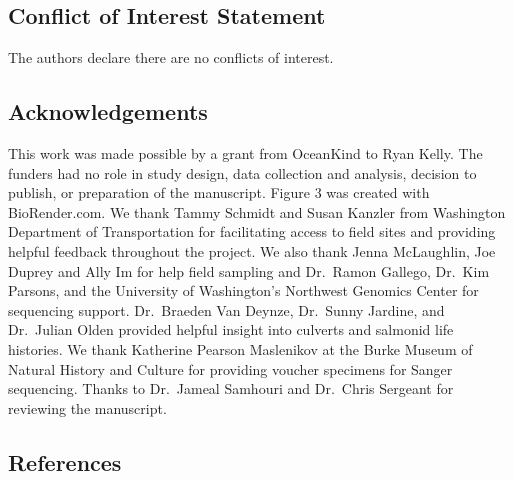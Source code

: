 \documentclass[
]{article}
\begin{document}
\hypertarget{conflict-of-interest-statement}{%
\subsection{Conflict of Interest
Statement}\label{conflict-of-interest-statement}}

The authors declare there are no conflicts of interest.

\hypertarget{acknowledgements}{%
\subsection{Acknowledgements}\label{acknowledgements}}

This work was made possible by a grant from OceanKind to Ryan Kelly. The
funders had no role in study design, data collection and analysis,
decision to publish, or preparation of the manuscript. Figure 3 was
created with BioRender.com. We thank Tammy Schmidt and Susan Kanzler
from Washington Department of Transportation for facilitating access to
field sites and providing helpful feedback throughout the project. We
also thank Jenna McLaughlin, Joe Duprey and Ally Im for help field
sampling and Dr.~Ramon Gallego, Dr.~Kim Parsons, and the University of
Washington's Northwest Genomics Center for sequencing support.
Dr.~Braeden Van Deynze, Dr.~Sunny Jardine, and Dr.~Julian Olden provided
helpful insight into culverts and salmonid life histories. We thank
Katherine Pearson Maslenikov at the Burke Museum of Natural History and
Culture for providing voucher specimens for Sanger sequencing. Thanks to
Dr.~Jameal Samhouri and Dr.~Chris Sergeant for reviewing the manuscript.

\hypertarget{references}{%
\subsection*{References}\label{references}}
\end{document}
